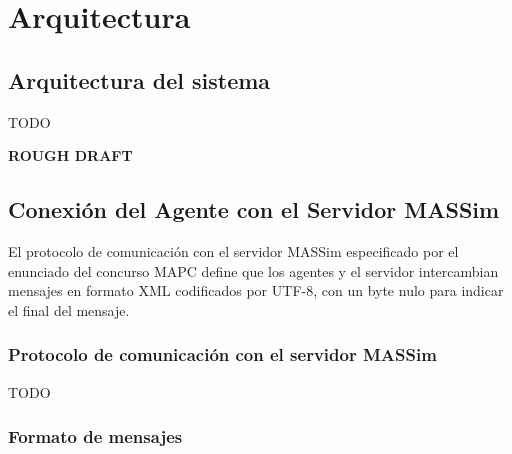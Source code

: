 
\chapter{Arquitectura}
\label{chap:Arquitectura}


\section{Arquitectura del sistema}
\label{sec:arquitectura_sistema}

 TODO

 \textbf{ROUGH DRAFT} 

\section[Conexión con el MASSim Server]
 {Conexión del Agente con el Servidor MASSim}
 \label{sec:conexion_massim}

 El protocolo de comunicación con el servidor MASSim especificado por 
 el enunciado del concurso MAPC define que los agentes y el servidor 
 intercambian mensajes en formato XML codificados por UTF-8, con un 
 byte nulo para indicar el final del mensaje. 

\subsection[Protocolo del MASSim Server]
 {Protocolo de comunicación con el servidor MASSim}
 \label{sub:protocolo_massim}

 TODO

\subsection{Formato de mensajes}
 \label{sub:formato_mensajes}

